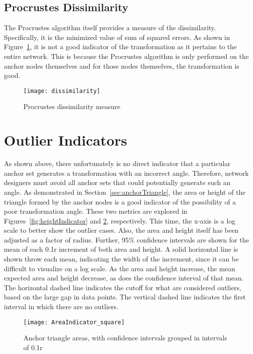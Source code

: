 \subsection{Procrustes Dissimilarity}

The Procrustes algorithm itself provides a measure of the dissimilarity.  Specifically, it is the minimized value of sum of squared errors\cite{procrustes-matlab}.  As shown in Figure~\ref{fig:dissimilarity}, it is not a good indicator of the transformation as it pertains to the entire network.  This is because the Procrustes algorithm is only performed on the anchor nodes themselves and for those nodes themselves, the transformation is good.

\begin{figure}
  \centering
	\texttt{[image: dissimilarity]}
	\caption{Procrustes dissimilarity measure}	
	\label{fig:dissimilarity}
\end{figure}

\section{Outlier Indicators} 
\label{sec:outlierindicators}
As shown above, there unfortunately is no direct indicator that a particular anchor set generates a transformation with an incorrect angle.  Therefore, network designers must avoid all anchor sets that could potentially generate such an angle.  As demonstrated in Section~\ref{sec:anchorTriangle}, the area or height of the triangle formed by the anchor nodes is a good indicator of the possibility of a poor transformation angle.  These two metrics are explored in Figures~\ref{fig:heightIndicator} and \ref{fig:areaIndicator}, respectively.  This time, the x-axis is a log scale to better show the outlier cases. Also, the area and height itself has been adjusted as a factor of radius. Further, 95\% confidence intervals are shown for the mean of each 0.1r increment of both area and height.  A solid horizontal line is shown throw each mean, indicating the width of the increment, since it can be difficult to visualize on a log scale.  As the area and height increase, the mean expected area and height decrease, as does the confidence interval of that mean.  The horizontal dashed line indicates the cutoff for what are considered outliers, based on the large gap in data points.  The vertical dashed line indicates the first interval in which there are no outliers.  

\begin{figure}
  \centering
	\texttt{[image: AreaIndicator\_square]}
	\caption[Anchor triangle areas]{Anchor triangle areas, with confidence intervals grouped in intervals of 0.1r}	
	\label{fig:areaIndicator}
\end{figure}

